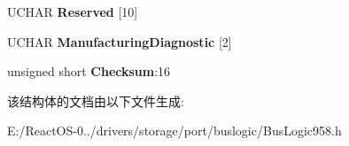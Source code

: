 \begin{DoxyCompactItemize}
U\+C\+H\+AR {\bfseries Reserved} \mbox{[}10\mbox{]}
\item 
\mbox{\label{struct_bus_logic___auto_s_c_s_i_data_af356adfc2233cca6e68f9546b8ba82a0}} 
U\+C\+H\+AR {\bfseries Manufacturing\+Diagnostic} \mbox{[}2\mbox{]}
\item 
\mbox{\label{struct_bus_logic___auto_s_c_s_i_data_aaf69c9bd13350e352788504a674a1449}} 
unsigned short {\bfseries Checksum}\+:16
\end{DoxyCompactItemize}


该结构体的文档由以下文件生成\+:\begin{DoxyCompactItemize}
\item 
E\+:/\+React\+O\+S-\/0../drivers/storage/port/buslogic/Bus\+Logic958.\+h\end{DoxyCompactItemize}

